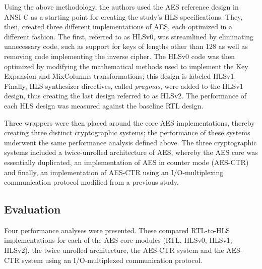 \documentclass[12pt,journal,compsoc,onecolumn]{IEEEtran}
\begin{document}
Using the above methodology, the authors used the AES reference design in ANSI C \cite{17} as a starting point for creating the study's HLS specifications. They, then, created three different implementations of AES, each optimized in a different fashion. The first, referred to as HLSv0, was streamlined by eliminating unnecessary code, such as support for keys of lengths other than 128 as well as removing code implementing the inverse cipher. The HLSv0 code was then optimized by modifying the mathematical methods used to implement the Key Expansion and MixColumns transformations; this design is labeled HLSv1. Finally, HLS synthesizer directives, called \emph{pragmas}, were added to the HLSv1 design, thus creating the last design referred to as HLSv2. The performance of each HLS design was measured against the baseline RTL design.

Three wrappers were then placed around the core AES implementations, thereby creating three distinct cryptographic systems; the performance of these systems underwent the same performance analysis defined above. The three cryptographic systems included a twice-unrolled architecture of AES, whereby the AES core was essentially duplicated, an implementation of AES in counter mode (AES-CTR) and finally, an implementation of AES-CTR using an I/O-multiplexing communication protocol modified from a previous study\cite{20}.


\subsection{Evaluation}\label{sec:evaluation}

Four performance analyses were presented. These compared RTL-to-HLS implementations for each of the AES core modules (RTL, HLSv0, HLSv1, HLSv2), the twice unrolled architecture, the AES-CTR system and the AES-CTR system using an I/O-multiplexed communication protocol. 
\end{document}
